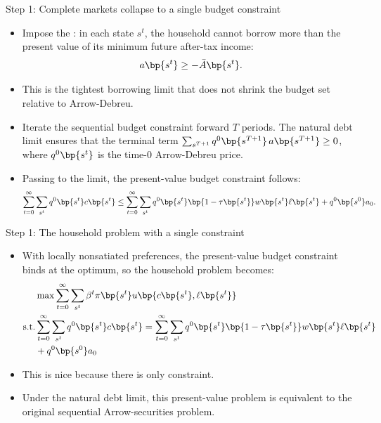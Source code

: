 \documentclass[11pt,xcolor={dvipsnames},aspectratio=159,hyperref={pdftex,pdfpagemode=UseNone,hidelinks,pdfdisplaydoctitle=true},usepdftitle=false]{beamer}
\begin{document}
        
            \begin{frame}{Step 1: Complete markets collapse to a single budget constraint}
            \begin{itemize}
            \item Impose the : in each state $s^t$, the household cannot borrow more than the present value of its minimum future after-tax income:
            \begin{align*}
                a\bp{s^t} \geq -\bar{A}\bp{s^t}.
            \end{align*}
            \item This is the tightest borrowing limit that does not shrink the budget set relative to Arrow-Debreu.
            \item Iterate the sequential budget constraint forward $T$ periods. The natural debt limit ensures that the terminal term $\sum_{s^{T+1}} q^0\bp{s^{T+1}}\, a\bp{s^{T+1}} \geq 0$, where $q^0\bp{s^t}$ is the time-0 Arrow-Debreu price.
            \item Passing to the limit, the present-value budget constraint follows:
            \begin{align*}
            \sum_{t=0}^\infty \sum_{s^t}  q^0\bp{s^t} c\bp{s^t}  \leq
            \sum_{t=0}^\infty \sum_{s^t}  q^0\bp{s^t} \bp{1 - \tau\bp{s^t} }w \bp{s^t} \ell\bp{s^t} +q^0\bp{s^0} a_0.
            \end{align*}
                \end{itemize}
            \end{frame}
        
            \begin{frame}{Step 1: The household problem with a single constraint}
            \begin{itemize}
            \item With locally nonsatiated preferences, the present-value budget constraint binds at the optimum, so the household problem becomes:
            \begin{align*}
                & \max \sum_{t=0}^\infty \sum_{s^t}  \beta^t \pi\bp{s^t} u\bp{c \bp{s^t},\ell\bp{s^t}}\\
                \text{s.t.} & \sum_{t=0}^\infty \sum_{s^t}  q^0\bp{s^t} c\bp{s^t}  =
                \sum_{t=0}^\infty \sum_{s^t}  q^0\bp{s^t} \bp{1 - \tau\bp{s^t} }w \bp{s^t} \ell\bp{s^t} \\ &  + q^0\bp{s^0}a_0
                \end{align*}
                \item This is nice because there is only  constraint.
                \item Under the natural debt limit, this present-value problem is equivalent to the original sequential Arrow-securities problem.
                    \end{itemize}
            \end{frame}
        
\end{document}
